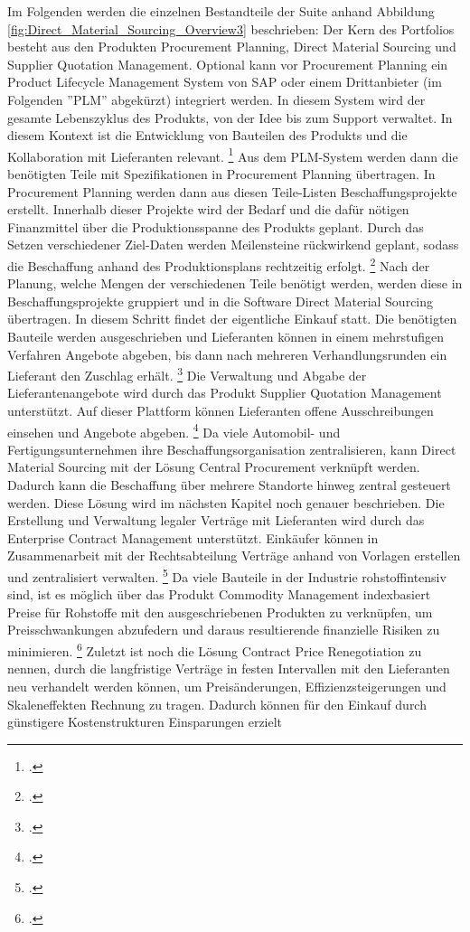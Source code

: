 Im Folgenden werden die einzelnen Bestandteile der Suite anhand Abbildung \ref{fig:Direct_Material_Sourcing_Overview3} beschrieben: Der Kern des Portfolios besteht aus den Produkten Procurement Planning, Direct Material Sourcing und Supplier Quotation Management. Optional kann vor Procurement Planning ein Product Lifecycle Management System von SAP oder einem Drittanbieter (im Folgenden ''PLM'' abgekürzt) integriert werden. In diesem System wird der gesamte Lebenszyklus des Produkts, von der Idee bis zum Support verwaltet. In diesem Kontext ist die Entwicklung von Bauteilen des Produkts und die Kollaboration mit Lieferanten relevant. \footcite[Vgl.][]{theorie_sap_plm_übersicht_2024} Aus dem PLM-System werden dann die benötigten Teile mit Spezifikationen in Procurement Planning übertragen. In Procurement Planning werden dann aus diesen Teile-Listen Beschaffungsprojekte erstellt. Innerhalb dieser Projekte wird der Bedarf und die dafür nötigen Finanzmittel über die Produktionsspanne des Produkts geplant. Durch das Setzen verschiedener Ziel-Daten werden Meilensteine rückwirkend geplant, sodass die Beschaffung anhand des Produktionsplans rechtzeitig erfolgt. \footcite[Vgl.][]{theorie_sap_procurement_planning_overview_2024} Nach der Planung, welche Mengen der verschiedenen Teile benötigt werden, werden diese in Beschaffungsprojekte gruppiert und in die Software Direct Material Sourcing übertragen. In diesem Schritt findet der eigentliche Einkauf statt. Die benötigten Bauteile werden ausgeschrieben und Lieferanten können in einem mehrstufigen Verfahren Angebote abgeben, bis dann nach mehreren Verhandlungsrunden ein Lieferant den Zuschlag erhält. \footcite[Vgl.][]{theorie_sap_webseite_dms_übersicht_2024} Die Verwaltung und Abgabe der Lieferantenangebote wird durch das Produkt Supplier Quotation Management unterstützt. Auf dieser Plattform können Lieferanten offene Ausschreibungen einsehen und Angebote abgeben. \footcite[Vgl.][]{theorie_sap_supplier_quotation_management_help_2024} Da viele Automobil- und Fertigungsunternehmen ihre Beschaffungsorganisation zentralisieren, kann Direct Material Sourcing mit der Lösung Central Procurement verknüpft werden. Dadurch kann die Beschaffung über mehrere Standorte hinweg zentral gesteuert werden. Diese Lösung wird im nächsten Kapitel noch genauer beschrieben. Die Erstellung und Verwaltung legaler Verträge mit Lieferanten wird durch das Enterprise Contract Management unterstützt. Einkäufer können in Zusammenarbeit mit der Rechtsabteilung Verträge anhand von Vorlagen erstellen und zentralisiert verwalten. \footcite[Vgl.][]{theorie_sap_enterprise_contract_management_2024} Da viele Bauteile in der Industrie rohstoffintensiv sind, ist es möglich über das Produkt Commodity Management indexbasiert Preise für Rohstoffe mit den ausgeschriebenen Produkten zu verknüpfen, um Preisschwankungen abzufedern und daraus resultierende finanzielle Risiken zu minimieren. \footcite[Vgl.][]{theorie_sap_commodity_management_2024} Zuletzt ist noch die Lösung Contract Price Renegotiation zu nennen, durch die langfristige Verträge in festen Intervallen mit den Lieferanten neu verhandelt werden können, um Preisänderungen, Effizienzsteigerungen und Skaleneffekten Rechnung zu tragen. Dadurch können für den Einkauf durch günstigere Kostenstrukturen Einsparungen erzielt 